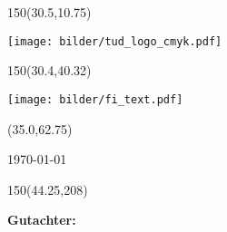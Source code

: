 
\begin{titlepage}

\begin{textblock}{150}(30.5,10.75)%
\raggedright
\texttt{[image: bilder/tud\_logo\_cmyk.pdf]}%
\end{textblock}


\begin{textblock}{150}(30.4,40.32)%
\raggedright
\texttt{[image: bilder/fi\_text.pdf]}
\end{textblock}

\begin{textblock}{89}(35.0,62.75)%
\begin{minipage}{80mm}
	\vfill
	\begin{center}
	\fontsize{24pt}{24pt} \textsf
	\Arbeitsbezeichnung
	
	\vspace{1cm}
	\begin{onehalfspace}
    \fontsize{18pt}{18pt}
    \textsf \Arbeitstitel
    \end{onehalfspace}
	
	\vspace{12mm}
\begin{onehalfspace}
	{\fontsize{14pt}{14pt}\textsf \Autor}
 \end{onehalfspace}
\begin{onehalfspace}
	  {\today}
\end{onehalfspace}
	\end{center}
	\vfill
\end{minipage}\end{textblock}

\begin{textblock}{150}(44.25,208)%
\begin{minipage}{120mm}
	\large
	\raggedright
	\textsf
    {\fontsize{14pt}{14pt}
	\textbf{Gutachter:}\\
	\Erstgutachter\\
}
\end{minipage}
\end{textblock}




\end{titlepage}
